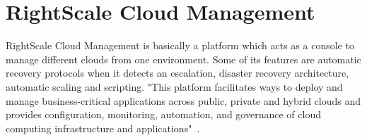 \section{RightScale Cloud Management}

RightScale Cloud Management is basically a platform which acts as a console to
manage different clouds from one environment. Some of its features are
automatic recovery protocols when it detects an escalation, disaster recovery 
architecture, automatic scaling and scripting. "This platform facilitates ways 
to deploy and manage business-critical applications across public, 
private and hybrid clouds and provides configuration, monitoring, automation, 
and governance of cloud computing infrastructure and
applications"~\cite{hid-sp18-418-RightScale-Cloud-Management-article}.

